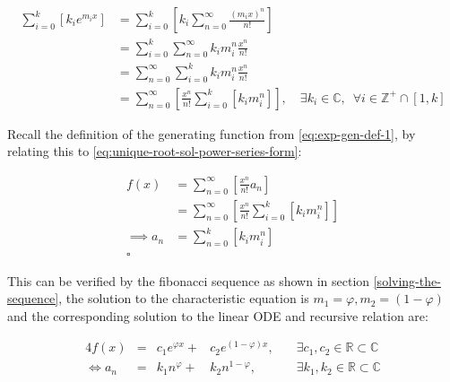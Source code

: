 \documentclass[11pt]{article}
\begin{document}
\begin{enumerate}
\begin{align}
    \sum^{k}_{i= 0}   {\left[{ k_i e^{m_i x}  }\right]}  &= \sum^{k}_{i= 0}   {\left[{ k_i \sum^{\infty}_{n= 0}   \frac{{\left({ m_i x }\right)}^n}{n!}  }\right]}  \nonumber \\
							 &= \sum^{k}_{i= 0}  \sum^{\infty}_{n= 0}   k_i m_i^n \frac{x^n}{n!} \nonumber\\
							 &=    \sum^{\infty}_{n= 0} \sum^{k}_{i= 0}   k_i m_i^n \frac{x^n}{n!} \nonumber \\
							 &= \sum^{\infty}_{n= 0} {\left[{ \frac{x^n}{n!}  \sum^{k}_{i=0}   {\left[{ k_im^n_i }\right]}  }\right]}, \quad \exists k_i \in \mathbb{C}, \enspace \forall i \in \mathbb{Z}^+\cap {\left[{ 1, k }\right]}     \label{eq:unique-root-sol-power-series-form}
\end{align}


Recall the definition of the generating function from \eqref{eq:exp-gen-def-1}, by relating this to \eqref{eq:unique-root-sol-power-series-form}:

\begin{align}
    f{\left({ x }\right)} &= \sum^{\infty}_{n= 0}   {\left[{  \frac{x^n}{n!} a_n }\right]} \nonumber \\
&= \sum^{\infty}_{n= 0} {\left[{ \frac{x^n}{n!}  \sum^{k}_{i=0}   {\left[{ k_im^n_i }\right]}  }\right]}  \nonumber \\
      \implies  a_n &= \sum^{k}_{n= 0} {\left[{ k_im_i^n }\right]}     \nonumber \\ \nonumber
\square
\end{align}

This can be verified by the fibonacci sequence as shown in section \ref{solving-the-sequence}, the solution to the characteristic equation is \(m_1 = \varphi, m_2 = {\left({ 1-\varphi }\right)}\) and the corresponding solution to the linear ODE and recursive relation are:

\begin{alignat}{4}
    f{\left({ x }\right)} &= &c_1 e^{\varphi x} +  &c_2 e^{{\left({ 1-\varphi }\right)} x}, \quad &\exists c_1, c_2 \in \mathbb{R} \subset \mathbb{C} \nonumber \\
    \iff  a_n &= &k_1 n^{\varphi} +  &k_2 n^{1- \varphi}, &\exists k_1, k_2 \in \mathbb{R} \subset \mathbb{C} \nonumber
\end{alignat}
\end{enumerate}
\end{document}

